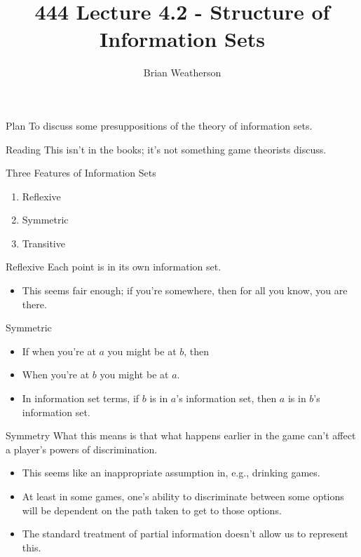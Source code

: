 \documentclass[
  ignorenonframetext,
]{beamer}
\title{444 Lecture 4.2 - Structure of Information Sets}
\author{Brian Weatherson}
\date{}
\providecommand{\tightlist}{%
  \setlength{\itemsep}{0pt}\setlength{\parskip}{0pt}}
\begin{document}
\frame{\titlepage}

\begin{frame}{Plan}
\protect\hypertarget{plan}{}
To discuss some presuppositions of the theory of information sets.
\end{frame}

\begin{frame}{Reading}
\protect\hypertarget{reading}{}
This isn't in the books; it's not something game theorists discuss.
\end{frame}

\begin{frame}{Three Features of Information Sets}
\protect\hypertarget{three-features-of-information-sets}{}
\begin{enumerate}
\tightlist
\item
  Reflexive
\item
  Symmetric
\item
  Transitive
\end{enumerate}
\end{frame}

\begin{frame}{Reflexive}
\protect\hypertarget{reflexive}{}
Each point is in its own information set.

\begin{itemize}
\tightlist
\item
  This seems fair enough; if you're somewhere, then for all you know,
  you are there.
\end{itemize}
\end{frame}

\begin{frame}{Symmetric}
\protect\hypertarget{symmetric}{}
\begin{itemize}
\tightlist
\item
  If when you're at \(a\) you might be at \(b\), then
\item
  When you're at \(b\) you might be at \(a\).
\item
  In information set terms, if \(b\) is in \(a\)'s information set, then
  \(a\) is in \(b\)'s information set.
\end{itemize}
\end{frame}

\begin{frame}{Symmetry}
\protect\hypertarget{symmetry}{}
What this means is that what happens earlier in the game can't affect a
player's powers of discrimination.

\begin{itemize}
\tightlist
\item
  This seems like an inappropriate assumption in, e.g., drinking games.
\item
  At least in some games, one's ability to discriminate between some
  options will be dependent on the path taken to get to those options.
\item
  The standard treatment of partial information doesn't allow us to
  represent this.
\end{itemize}
\end{frame}
\end{document}
